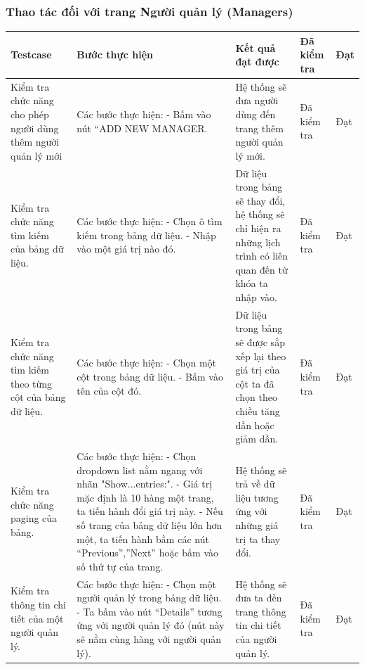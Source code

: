 \documentclass[a4paper]{article}
\begin{document}
\subsubsection{Thao tác đối với trang Người quản lý  (Managers)}
\begin{longtable}{ | p{} |p{} | p{}  | p{}  | p{}  | } 
\hline
\textbf{Testcase}& \textbf{Bước thực hiện}& \textbf{Kết quả đạt được} & \textbf{Đã kiểm tra}& \textbf{Đạt} \\ 
\hline
\hline
Kiểm tra chức năng cho phép người dùng thêm người quản lý mới &
Các bước thực hiện: \newline
- Bấm vào nút “ADD NEW MANAGER.
&
Hệ thống sẽ đưa người dùng đến trang thêm người quản lý mới. &
Đã kiểm tra &
Đạt \\

\hline
Kiểm tra chức năng tìm kiếm của bảng dữ liệu. &
Các bước thực hiện: \newline
- Chọn ô tìm kiếm trong bảng dữ liệu. \newline
- Nhập vào một giá trị nào đó. 
&
Dữ liệu trong bảng sẽ thay đổi, hệ thống sẽ chỉ hiện ra những lịch trình có liên quan đến từ khóa ta nhập vào. &
Đã kiểm tra &
Đạt \\

\hline
Kiểm tra chức năng tìm kiếm theo từng cột của bảng dữ liệu. &
Các bước thực hiện: \newline
- Chọn một cột trong bảng dữ liệu.  \newline
- Bấm vào tên của cột đó. 
&
Dữ liệu trong bảng sẽ được sắp xếp lại theo giá trị của cột ta đã chọn theo chiều tăng dần hoặc giảm dần. &
Đã kiểm tra &
Đạt \\

\hline
Kiểm tra chức năng paging của bảng. &
Các bước thực hiện: \newline
- Chọn dropdown list nằm ngang với nhãn "Show...entries:".   \newline
- Giá trị mặc định là 10 hàng một trang, ta tiến hành đổi giá trị này. \newline
- Nếu số trang của bảng dữ liệu lớn hơn một, ta tiến hành bầm các nút “Previous”,”Next” hoặc bấm vào số thứ tự của trang.
&
Hệ thống sẽ trả về dữ liệu tương ứng với những giá trị ta thay đổi. &
Đã kiểm tra &
Đạt \\

\hline
Kiểm tra thông tin chi tiết của một người quản lý. &
Các bước thực hiện: \newline
- Chọn một người quản lý trong bảng dữ liệu.    \newline
- Ta bấm vào nút “Details” tương ứng với người quản lý đó (nút này sẽ nằm cùng hàng với người quản lý).  
&
Hệ thống sẽ đưa ta đến trang thông tin chi tiết của người quản lý. &
Đã kiểm tra &
Đạt \\


\end{longtable}
\end{document}
